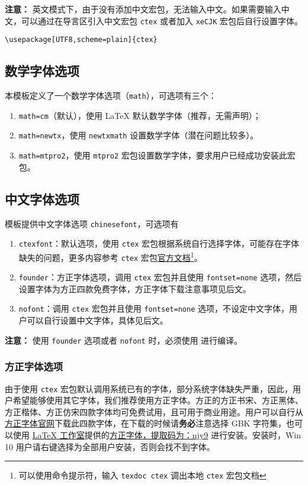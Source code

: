 \documentclass[lang=cn,11pt,a4paper,cite=authoryear]{elegantpaper}
\begin{document}
\textbf{注意：} 英文模式下，由于没有添加中文宏包，无法输入中文。如果需要输入中文，可以通过在导言区引入中文宏包 \lstinline{ctex} 或者加入 \lstinline{xeCJK} 宏包后自行设置字体。 
\begin{lstlisting}
\usepackage[UTF8,scheme=plain]{ctex}
\end{lstlisting}

\subsection{数学字体选项}

本模板定义了一个数学字体选项（\lstinline{math}），可选项有三个：
\begin{enumerate}
  \item \lstinline{math=cm}（默认），使用 \LaTeX{} 默认数学字体（推荐，无需声明）；
  \item \lstinline{math=newtx}，使用 \lstinline{newtxmath} 设置数学字体（潜在问题比较多）。
  \item \lstinline{math=mtpro2}，使用 \lstinline{mtpro2} 宏包设置数学字体，要求用户已经成功安装此宏包。
\end{enumerate}

\subsection{中文字体选项}
模板提供中文字体选项 \lstinline{chinesefont}，可选项有
\begin{enumerate}
\item \lstinline{ctexfont}：默认选项，使用 \lstinline{ctex} 宏包根据系统自行选择字体，可能存在字体缺失的问题，更多内容参考 \lstinline{ctex} 宏包\href{https://ctan.org/pkg/ctex}{官方文档}\footnote{可以使用命令提示符，输入 \lstinline{texdoc ctex} 调出本地 \lstinline{ctex} 宏包文档}。
\item \lstinline{founder}：方正字体选项，调用 \lstinline{ctex} 宏包并且使用 \lstinline{fontset=none} 选项，然后设置字体为方正四款免费字体，方正字体下载注意事项见后文。
\item \lstinline{nofont}：调用 \lstinline{ctex} 宏包并且使用 \lstinline{fontset=none} 选项，不设定中文字体，用户可以自行设置中文字体，具体见后文。
\end{enumerate}

\noindent \textbf{注意：} 使用 \lstinline{founder} 选项或者 \lstinline{nofont} 时，必须使用  进行编译。

\subsubsection{方正字体选项}
由于使用 \lstinline{ctex} 宏包默认调用系统已有的字体，部分系统字体缺失严重，因此，用户希望能够使用其它字体，我们推荐使用方正字体。方正的{\songti 方正书宋}、{\heiti 方正黑体}、{\kaishu 方正楷体}、{\fangsong 方正仿宋}四款字体均可免费试用，且可用于商业用途。用户可以自行从\href{http://www.foundertype.com/}{方正字体官网}下载此四款字体，在下载的时候请\textbf{务必}注意选择 GBK 字符集，也可以使用 \href{https://www.latexstudio.net/}{\LaTeX{} 工作室}提供的\href{https://pan.baidu.com/s/1BgbQM7LoinY7m8yeP25Y7Q}{方正字体，提取码为：njy9} 进行安装。安装时，{\kaishu Win 10 用户请右键选择为全部用户安装，否则会找不到字体。}
\end{document}
